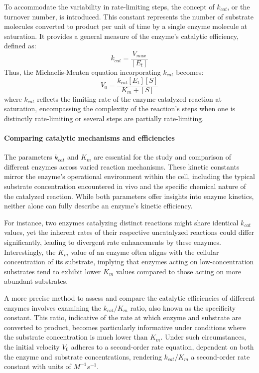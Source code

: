To accommodate the variability in rate-limiting steps, the concept of $k_{cat}$, or the turnover 
number, is introduced. This constant represents the number of substrate molecules converted to 
product per unit of time by a single enzyme molecule at saturation. It provides a general measure 
of the enzyme's catalytic efficiency, defined as:
$$
k_{cat} = \frac{V_{max}}{[E_t]}
$$
Thus, the Michaelis-Menten equation incorporating $k_{cat}$ becomes:
$$
V_0 = \frac{k_{cat}[E_t][S]}{K_m + [S]}
$$
where $k_{cat}$ reflects the limiting rate of the enzyme-catalyzed reaction at saturation, 
encompassing the complexity of the reaction's steps when one is distinctly rate-limiting or several 
steps are partially rate-limiting.

\paragraph{Comparing catalytic mechanisms and efficiencies}
The parameters $k_{cat}$ and $K_m$ are essential for the study and comparison of different enzymes 
across varied reaction mechanisms. These kinetic constants mirror the enzyme's operational 
environment within the cell, including the typical substrate concentration encountered in vivo 
and the specific chemical nature of the catalyzed reaction. While both parameters offer insights 
into enzyme kinetics, neither alone can fully describe an enzyme's kinetic efficiency. 

For instance, two enzymes catalyzing distinct reactions might share identical $k_{cat}$ values, 
yet the inherent rates of their respective uncatalyzed reactions could differ significantly, 
leading to divergent rate enhancements by these enzymes. Interestingly, the $K_m$ value of an 
enzyme often aligns with the cellular concentration of its substrate, implying that enzymes acting 
on low-concentration substrates tend to exhibit lower $K_m$ values compared to those acting on more 
abundant substrates.

A more precise method to assess and compare the catalytic efficiencies of different enzymes involves 
examining the $k_{cat}/K_m$ ratio, also known as the specificity constant. This ratio, indicative 
of the rate at which enzyme and substrate are converted to product, becomes particularly informative 
under conditions where the substrate concentration is much lower than $K_m$. Under such circumstances, 
the initial velocity $V_0$ adheres to a second-order rate equation, dependent on both the enzyme and 
substrate concentrations, rendering $k_{cat}/K_m$ a second-order rate constant with units of 
$M^{-1}s^{-1}$.

